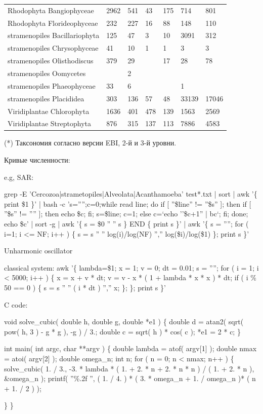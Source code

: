 \documentclass[a4paper]{article}
\begin{document}
\begin{tabular}{lllllll}
Rhodophyta Bangiophyceae&2962&541&43&175&714&801\\
Rhodophyta Florideophyceae&232&227&16&88&148&110\\
stramenopiles Bacillariophyta&125&47&3&10&3091&312\\
stramenopiles Chrysophyceae&41&10&1&1&3&3\\
stramenopiles Olisthodiscus&379&29&&17&28&78\\
stramenopiles Oomycetes&&2&&&&\\
stramenopiles Phaeophyceae&33&6&&&1&\\
stramenopiles Placididea&303&136&57&48&33139&17046\\
Viridiplantae Chlorophyta&1636&401&478&139&1563&2569\\
Viridiplantae Streptophyta&876&315&137&113&7886&4583\\
\hline
\end{tabular}

{\small(*) Таксономия согласно версии EBI, 2-й и 3-й уровни.}

Кривые численности: 

e.g, SAR:

grep -E 'Cercozoa|strametopiles|Alveolata|Acanthamoeba' test*.txt | sort | awk '\{ print \$1 \}' |  bash -c 's='''';c=0;while read line; do if [ ''\$line'' != ''\$s'' ]; then if [ ''\$s'' != '''' ]; then echo \$c; fi; s=\$line; c=1; else c=`echo ''\$c+1'' | bc`; fi; done; echo \$c' | sort -g | awk '\{ s = \$0 '' '' s \} END \{ print s \}' | awk '\{ s = ''''; for ( i=1; i <= NF; i++ ) \{ s = s '' '' log(i)/log(NF) '','' log(\$i)/log(\$1) \}; print s \}'

Unharmonic oscillator

classical system:
{\texttt \small
awk '\{ lambda=\$1; x = 1; v = 0; dt = 0.01; s = ''''; for ( i = 1; i < 5000; i++ ) \{ x = x + v * dt; v = v - x * ( 1 + lambda * x * x ) * dt; if ( i \% 50 == 0 ) \{ s = s '' '' ( i * dt ) '','' x; \}; \}; print s \}' 
}

C code:

{\texttt \small
void solve\_cubic( double h, double g, double *e1 ) \{ double d = atan2( sqrt( pow( h, 3 ) - g * g ), -g ) / 3.;   double c = sqrt( h ) * cos( c );  *e1 = 2 * c; \}

    
int main( int argc, char **argv ) 
\{  
    double lambda = atof( argv[1] );
    double nmax = atoi( argv[2] );
    double omega\_n;    
    int n;
    for ( n = 0; n < nmax; n++ )
    \{
        solve\_cubic( 1. / 3., -3. * lambda * ( 1. + 2. * n + 2. * n * n ) / ( 1. + 2. * n ), \&omega\_n );
        printf( ''\%.2f '', ( 1. / 4. ) * ( 3. * omega\_n + 1. / omega\_n )* ( n + 1. / 2 ) );

    \}
 \}
}
 
\end{document}
